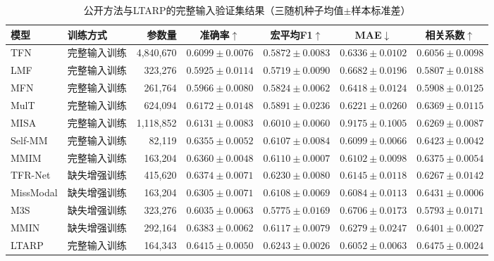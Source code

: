 \begin{table}[H]
\centering\scriptsize\setlength{\tabcolsep}{2.25pt}
\caption{公开方法与LTARP的完整输入验证集结果（三随机种子均值$\pm$样本标准差）}
\label{tab:q2_public_baselines}
\begin{tabular}{llrcccc}
\toprule
模型 & 训练方式 & 参数量 & 准确率$\uparrow$ & 宏平均F1$\uparrow$ & MAE$\downarrow$ & 相关系数$\uparrow$\\
\midrule
TFN & 完整输入训练 & 4,840,670 & $0.6099\pm0.0076$ & $0.5872\pm0.0083$ & $0.6336\pm0.0102$ & $0.6056\pm0.0098$\\
LMF & 完整输入训练 & 323,276 & $0.5925\pm0.0114$ & $0.5719\pm0.0090$ & $0.6682\pm0.0196$ & $0.5807\pm0.0188$\\
MFN & 完整输入训练 & 261,764 & $0.5966\pm0.0080$ & $0.5824\pm0.0062$ & $0.6418\pm0.0124$ & $0.5908\pm0.0125$\\
MulT & 完整输入训练 & 624,094 & $0.6172\pm0.0148$ & $0.5891\pm0.0236$ & $0.6221\pm0.0260$ & $0.6369\pm0.0115$\\
MISA & 完整输入训练 & 1,118,852 & $0.6131\pm0.0083$ & $0.6010\pm0.0060$ & $0.9175\pm0.1005$ & $0.6269\pm0.0087$\\
Self-MM & 完整输入训练 & 82,119 & $0.6355\pm0.0052$ & $0.6107\pm0.0084$ & $0.6099\pm0.0066$ & $0.6423\pm0.0042$\\
MMIM & 完整输入训练 & 163,204 & $0.6360\pm0.0048$ & $0.6110\pm0.0007$ & $0.6102\pm0.0098$ & $0.6375\pm0.0054$\\
\addlinespace\midrule
TFR-Net & 缺失增强训练 & 415,620 & $0.6374\pm0.0071$ & $0.6230\pm0.0080$ & $0.6145\pm0.0118$ & $0.6267\pm0.0142$\\
MissModal & 缺失增强训练 & 163,204 & $0.6305\pm0.0071$ & $0.6108\pm0.0069$ & $0.6084\pm0.0113$ & $0.6431\pm0.0006$\\
M3S & 缺失增强训练 & 323,276 & $0.6035\pm0.0063$ & $0.5775\pm0.0169$ & $0.6706\pm0.0173$ & $0.5793\pm0.0171$\\
MMIN & 缺失增强训练 & 292,164 & $0.6383\pm0.0062$ & $0.6117\pm0.0079$ & $0.6279\pm0.0247$ & $0.6401\pm0.0027$\\
\addlinespace\midrule
LTARP & 完整输入训练 & 164,343 & $0.6415\pm0.0050$ & $0.6243\pm0.0026$ & $0.6052\pm0.0063$ & $0.6475\pm0.0024$\\
\bottomrule
\end{tabular}
\end{table}
